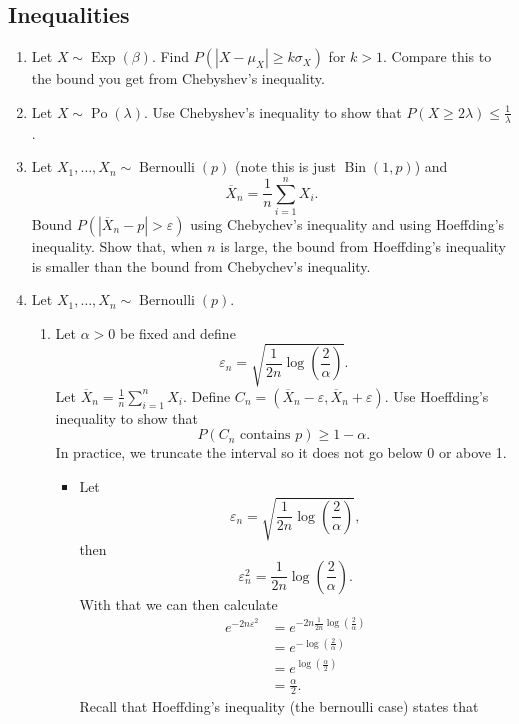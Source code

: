 \documentclass{article}
\begin{document}
\subsection{Inequalities}
\begin{enumerate}
	\item Let $X \sim \operatorname{Exp}(\beta)$. Find $P(|X - \mu_X| \geq k \sigma_X)$ for $k > 1$. Compare this to the bound you get from Chebyshev's inequality.
	\item Let $X \sim \operatorname{Po}(\lambda)$. Use Chebyshev's inequality to show that $P(X \geq 2\lambda) \leq \frac{1}{\lambda}$.
	\item Let $X_1, \dots, X_n \sim \operatorname{Bernoulli}(p)$ (note this is just $\operatorname{Bin}(1, p)$) and
	$$
	\overline{X}_n = \frac{1}{n} \sum_{i = 1}^n X_i.
	$$
	Bound $P(|\overline{X}_n - p| > \varepsilon)$ using Chebychev's inequality and using Hoeffding's inequality. Show that, when $n$ is large, the bound from Hoeffding's inequality is smaller than the bound from Chebychev's inequality.
	\item Let $X_1, \dots, X_n \sim \operatorname{Bernoulli}(p)$.
		\begin{enumerate}
			\item Let $\alpha > 0$ be fixed and define
			$$
			\varepsilon_n = \sqrt{\frac{1}{2n}\log\left(\frac{2}{\alpha}\right)}.
			$$
			Let $\overline{X}_n = \frac{1}{n}\sum_{i = 1}^n X_i$. Define $C_n = (\overline{X}_n - \varepsilon, \overline{X}_n + \varepsilon)$. Use Hoeffding's inequality to show that
			$$
			P(C_n\text{ contains }p) \geq 1 - \alpha.
			$$
			In practice, we truncate the interval so it does not go below $0$ or above 1.
				\begin{itemize}
					\item Let
					$$
					\varepsilon_n = \sqrt{\frac{1}{2n} \log\left(\frac{2}{\alpha}\right)},
					$$
					then
					$$
					\varepsilon_n^2 = \frac{1}{2n} \log\left(\frac{2}{\alpha}\right).
					$$
					With that we can then calculate
					$$
					\begin{aligned}
					e^{-2n\varepsilon^2} &= e^{- 2n \frac{1}{2n} \log\left( \frac{2}{\alpha} \right)} \\
					&= e^{- \log \left( \frac{2}{\alpha} \right)} \\
					&= e^{\log\left( \frac{\alpha}{2} \right)} \\
					&= \frac{\alpha}{2}.
					\end{aligned}
					$$
					Recall that Hoeffding's inequality (the bernoulli case) states that
					$$
$$
\end{itemize}
\end{enumerate}
\end{enumerate}
\end{document}
